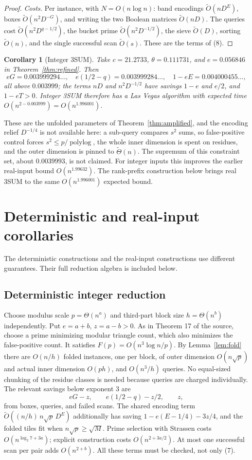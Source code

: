 \documentclass[11pt]{article}
\newtheorem{corollary}[theorem]{Corollary}
\newcommand{\softO}{\widetilde O}
\begin{document}
\begin{proof}
\emph{Costs.} Per instance, with $N=O(n\log n)$: band encodings
$\softO(nD^E)$, boxes $\softO(n^2D^{-G})$, and writing the two Boolean
matrices $\softO(nD)$. The queries cost $\softO(n^2D^{q-1/2})$, the bucket
prime $\softO(n^2D^{-1/2})$, the sieve $\softO(D)$, sorting $\softO(n)$, and
the single successful scan $\softO(s)$. These are the terms of (8).
\end{proof}

\begin{corollary}[Integer 3SUM]
Take $c=21.2733$, $\theta=0.111731$, and $e=0.056846$ in
Theorem~\ref{thm:refined}. Then
\[
eG=0.003999294\ldots,\quad e(1/2-q)=0.003999284\ldots,\quad
1-eE=0.004000455\ldots,
\]
all above $0.003999$; the terms $nD$ and $n^2D^{-1/2}$ have savings
$1-e$ and $e/2$, and $1-eT>0$. Integer 3SUM therefore has a Las Vegas
algorithm with expected time $O(n^{2-0.003999})=O(n^{1.996001})$.
\end{corollary}
These are the unfolded parameters of Theorem~\ref{thm:amplified}, and the
encoding relief $D^{-1/4}$ is not available here: a sub-query compares $s^2$
sums, so false-positive control forces $s^2\le p/\operatorname{polylog}$,
the whole inner dimension is spent on residues, and the outer dimension is
pinned to $\widetilde\Theta(n)$. The supremum of this constraint set, about
$0.0039993$, is not claimed. For integer inputs this improves the
earlier real-input bound $O(n^{1.99632})$. The rank-prefix construction below
brings real 3SUM to the same $O(n^{1.996001})$ expected bound.

\section{Deterministic and real-input corollaries}
The deterministic constructions and the real-input constructions use
different guarantees. Their full reduction algebra is included below.

\subsection*{Deterministic integer reduction}
Choose modulus scale $p=\Theta(n^a)$ and third-part block size
$h=\Theta(n^b)$ independently. Put $e=a+b$, $z=a-b>0$.
As in Theorem 17 of the source, choose a prime minimizing modular triangle
count, which also minimizes the false-positive count. It satisfies
$F(p)=O(n^3\log n/p)$. By Lemma~\ref{lem:fold} there are $O(n/h)$ folded
instances, one per block, of outer dimension $O(n\sqrt p)$ and actual inner
dimension $O(ph)$, and $O(n^3/h)$ queries. No equal-sized chunking of the
residue classes is needed because queries are charged individually. The
relevant savings below exponent $3$ are
\[
eG-z,\qquad e(1/2-q)-z/2,\qquad z,
\tag{7}
\]
from boxes, queries, and failed scans. The shared encoding term
$\softO((n/h)\,n\sqrt p\,D^E)$ additionally has saving
$1-e(E-1/4)-3z/4$, and the folded tiles fit when $n\sqrt p\ge\sqrt M$.
Prime selection with Strassen costs $O(n^{\log_2 7+3a})$; explicit
construction costs $O(n^{2+3a/2})$.
At most one successful scan per pair adds $O(n^{2+b})$.
All these terms must be checked, not only (7).
\end{document}
